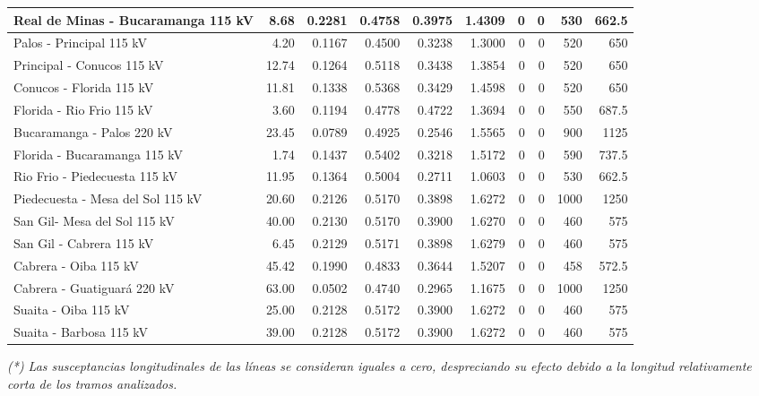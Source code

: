 \begin{center}
\begin{longtable}{|p{5.8cm}|r|r|r|r|r|r|r|r|r|}
\hline
Real de Minas - Bucaramanga 115 kV & 8.68 & 0.2281 & 0.4758 & 0.3975 & 1.4309 & 0 & 0 & 530 & 662.5 \\
\hline
Palos - Principal 115 kV & 4.20 & 0.1167 & 0.4500 & 0.3238 & 1.3000 & 0 & 0 & 520 & 650 \\
\hline
Principal - Conucos 115 kV & 12.74 & 0.1264 & 0.5118 & 0.3438 & 1.3854 & 0 & 0 & 520 & 650 \\
\hline
Conucos - Florida 115 kV & 11.81 & 0.1338 & 0.5368 & 0.3429 & 1.4598 & 0 & 0 & 520 & 650 \\
\hline
Florida - Rio Frio 115 kV & 3.60 & 0.1194 & 0.4778 & 0.4722 & 1.3694 & 0 & 0 & 550 & 687.5 \\
\hline
Bucaramanga - Palos 220 kV & 23.45 & 0.0789 & 0.4925 & 0.2546 & 1.5565 & 0 & 0 & 900 & 1125 \\
\hline
Florida - Bucaramanga 115 kV & 1.74 & 0.1437 & 0.5402 & 0.3218 & 1.5172 & 0 & 0 & 590 & 737.5 \\
\hline
Rio Frio - Piedecuesta 115 kV & 11.95 & 0.1364 & 0.5004 & 0.2711 & 1.0603 & 0 & 0 & 530 & 662.5 \\
\hline
Piedecuesta - Mesa del Sol 115 kV & 20.60 & 0.2126 & 0.5170 & 0.3898 & 1.6272 & 0 & 0 & 1000 & 1250 \\
\hline
San Gil- Mesa del Sol 115 kV & 40.00 & 0.2130 & 0.5170 & 0.3900 & 1.6270 & 0 & 0 & 460 & 575 \\
\hline
San Gil - Cabrera 115 kV & 6.45 & 0.2129 & 0.5171 & 0.3898 & 1.6279 & 0 & 0 & 460 & 575 \\
\hline
Cabrera - Oiba 115 kV & 45.42 & 0.1990 & 0.4833 & 0.3644 & 1.5207 & 0 & 0 & 458 & 572.5 \\
\hline
Cabrera - Guatiguará 220 kV & 63.00 & 0.0502 & 0.4740 & 0.2965 & 1.1675 & 0 & 0 & 1000 & 1250 \\
\hline
Suaita - Oiba 115 kV & 25.00 & 0.2128 & 0.5172 & 0.3900 & 1.6272 & 0 & 0 & 460 & 575 \\
\hline
Suaita - Barbosa 115 kV & 39.00 & 0.2128 & 0.5172 & 0.3900 & 1.6272 & 0 & 0 & 460 & 575 \\

\end{longtable}
\end{center}

\vspace{-0.2cm}

\begin{minipage}{0.90\textwidth}
\footnotesize
\textit{(*) Las susceptancias longitudinales de las líneas se consideran iguales a cero,
despreciando su efecto debido a la longitud relativamente corta de los tramos analizados.
}
\end{minipage}

